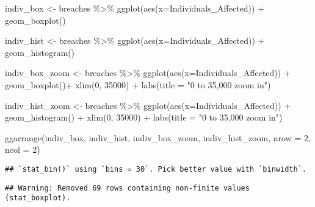 \documentclass[
]{article}
\newenvironment{Shaded}{\begin{snugshade}}{\end{snugshade}}
\newcommand{\AttributeTok}[1]{\textcolor[rgb]{0.77,0.63,0.00}{#1}}
\newcommand{\DecValTok}[1]{\textcolor[rgb]{0.00,0.00,0.81}{#1}}
\newcommand{\FunctionTok}[1]{\textcolor[rgb]{0.00,0.00,0.00}{#1}}
\newcommand{\NormalTok}[1]{#1}
\newcommand{\OtherTok}[1]{\textcolor[rgb]{0.56,0.35,0.01}{#1}}
\newcommand{\SpecialCharTok}[1]{\textcolor[rgb]{0.00,0.00,0.00}{#1}}
\newcommand{\StringTok}[1]{\textcolor[rgb]{0.31,0.60,0.02}{#1}}
\begin{document}
\begin{Shaded}
\begin{Highlighting}[]
\NormalTok{indiv\_box }\OtherTok{\textless{}{-}}\NormalTok{ breaches }\SpecialCharTok{\%\textgreater{}\%}
  \FunctionTok{ggplot}\NormalTok{(}\FunctionTok{aes}\NormalTok{(}\AttributeTok{x=}\NormalTok{Individuals\_Affected)) }\SpecialCharTok{+}
  \FunctionTok{geom\_boxplot}\NormalTok{()}

\NormalTok{indiv\_hist }\OtherTok{\textless{}{-}}\NormalTok{ breaches }\SpecialCharTok{\%\textgreater{}\%}
  \FunctionTok{ggplot}\NormalTok{(}\FunctionTok{aes}\NormalTok{(}\AttributeTok{x=}\NormalTok{Individuals\_Affected)) }\SpecialCharTok{+}
  \FunctionTok{geom\_histogram}\NormalTok{()}

\NormalTok{indiv\_box\_zoom }\OtherTok{\textless{}{-}}\NormalTok{ breaches }\SpecialCharTok{\%\textgreater{}\%}
  \FunctionTok{ggplot}\NormalTok{(}\FunctionTok{aes}\NormalTok{(}\AttributeTok{x=}\NormalTok{Individuals\_Affected)) }\SpecialCharTok{+}
  \FunctionTok{geom\_boxplot}\NormalTok{()}\SpecialCharTok{+}
  \FunctionTok{xlim}\NormalTok{(}\DecValTok{0}\NormalTok{, }\DecValTok{35000}\NormalTok{) }\SpecialCharTok{+} 
  \FunctionTok{labs}\NormalTok{(}\AttributeTok{title =} \StringTok{"0 to 35,000 zoom in"}\NormalTok{)}

\NormalTok{indiv\_hist\_zoom }\OtherTok{\textless{}{-}}\NormalTok{ breaches }\SpecialCharTok{\%\textgreater{}\%}
  \FunctionTok{ggplot}\NormalTok{(}\FunctionTok{aes}\NormalTok{(}\AttributeTok{x=}\NormalTok{Individuals\_Affected)) }\SpecialCharTok{+}
  \FunctionTok{geom\_histogram}\NormalTok{() }\SpecialCharTok{+} 
  \FunctionTok{xlim}\NormalTok{(}\DecValTok{0}\NormalTok{, }\DecValTok{35000}\NormalTok{) }\SpecialCharTok{+} 
  \FunctionTok{labs}\NormalTok{(}\AttributeTok{title =} \StringTok{"0 to 35,000 zoom in"}\NormalTok{)}

\FunctionTok{ggarrange}\NormalTok{(indiv\_box, indiv\_hist, indiv\_box\_zoom, indiv\_hist\_zoom,  }\AttributeTok{nrow =} \DecValTok{2}\NormalTok{, }\AttributeTok{ncol =} \DecValTok{2}\NormalTok{)}
\end{Highlighting}
\end{Shaded}

\begin{verbatim}
## `stat_bin()` using `bins = 30`. Pick better value with `binwidth`.
\end{verbatim}

\begin{verbatim}
## Warning: Removed 69 rows containing non-finite values (stat_boxplot).
\end{verbatim}
\end{document}

